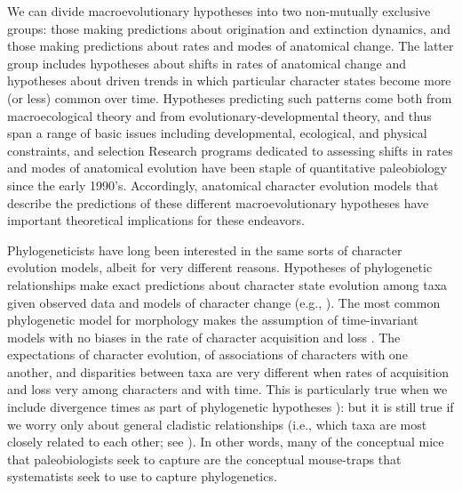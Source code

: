 \documentclass{article}
\begin{document}
We can divide macroevolutionary hypotheses into two non-mutually exclusive groups: those making predictions about origination and extinction dynamics, and those making predictions about rates and modes of anatomical change. 
The latter group includes hypotheses about shifts in rates of anatomical change and hypotheses about driven trends in which particular character states become more (or less) common over time.  
Hypotheses predicting such patterns come both from macroecological theory and from evolutionary‑developmental theory, and thus span a range of basic issues including developmental, ecological, and physical constraints, and selection  \citep{valentine1969patterns, valentine1980determinants}
Research programs dedicated to assessing shifts in rates and modes of anatomical evolution have been staple of quantitative paleobiology since the early 1990’s. 
Accordingly, anatomical character evolution models that describe the predictions of these different macroevolutionary hypotheses have important theoretical implications for these endeavors. 

Phylogeneticists have long been interested in the same sorts of character evolution models, albeit for very different reasons.  
Hypotheses of phylogenetic relationships make exact predictions about character state evolution among taxa given observed data and models of character change (e.g., \cite{Kimura1980, Felsenstein1981, Hasegawa1985, Tavare1986}).  
The most common phylogenetic model for morphology makes the assumption of time-invariant models with no biases in the rate of character acquisition and loss \citep{Lewis2001}.
The expectations of character evolution, of associations of characters with one another, and disparities between taxa are very different when rates of acquisition and loss very among characters and with time.
This is particularly true when we include divergence times as part of phylogenetic hypotheses \citep{Huelsenbeck2000a, Sanderson2002, Drummond2006}): but it is still true if we worry only about general cladistic relationships (i.e., which taxa are most closely related to each other; see \cite{Felsenstein1981, Nylander2004, Wright2016}).  
In other words, many of the conceptual mice that paleobiologists seek to capture are the conceptual mouse-traps that systematists seek to use to capture phylogenetics.  
\end{document}
